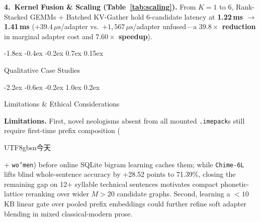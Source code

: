 \documentclass[10pt,twocolumn,letterpaper]{article}
\makeatletter
\newcommand{\zh}[1]{\begin{CJK*}{UTF8}{gbsn}{\small #1}\end{CJK*}}
\newcommand{\zh}[1]{#1}
\renewcommand\section{\@startsection {section}{1}{\z@}%
  {-2.2ex \@plus -0.6ex \@minus -0.2ex}%
  {1.0ex \@plus 0.2ex}%
  {\normalfont\large\bfseries\raggedright}}
\renewcommand\subsection{\@startsection{subsection}{2}{\z@}%
  {-1.8ex \@plus -0.4ex \@minus -0.2ex}%
  {0.7ex \@plus 0.15ex}%
  {\normalfont\normalsize\fontsize{10.8}{13}\selectfont\bfseries\raggedright}}
\makeatother
\begin{document}
\textbf{4.\ Kernel Fusion \& Scaling (Table~\ref{tab:scaling}).} From $K=1$ to $6$, Rank-Stacked GEMMs + Batched KV-Gather hold 6-candidate latency at \textbf{1.22\,ms $\to$ 1.41\,ms} ($+39.4\,\mu\text{s}$/adapter vs.\ $+1{,}567\,\mu\text{s}$/adapter unfused---a \textbf{$39.8\times$ reduction} in marginal adapter cost and \textbf{$7.60\times$ speedup}).

\subsection{Qualitative Case Studies}


\section{Limitations \& Ethical Considerations}

\textbf{Limitations.} First, novel neologisms absent from all mounted \texttt{.imepack}s still require first-time prefix composition (\zh{今天} + \texttt{wo'men}) before online SQLite bigram learning caches them; while \texttt{Chime-6L} lifts blind whole-sentence accuracy by +28.52 points to 71.39\%, closing the remaining gap on 12+ syllable technical sentences motivates compact phonetic-lattice reranking over wider $M > 20$ candidate graphs. Second, learning a $< 10$\,KB linear gate over pooled prefix embeddings could further refine soft adapter blending in mixed classical-modern prose.
\end{document}
